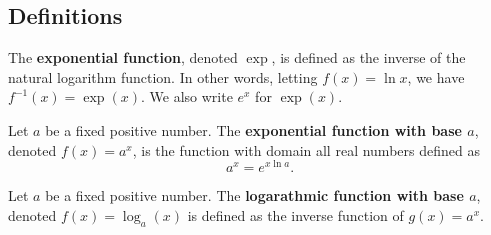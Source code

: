 \subsection*{Definitions}
\begin{namedtheorem} The {\bf exponential function}, denoted $\exp$, is defined as the inverse of the natural logarithm function. In other words, letting $f(x)=\ln x$, we have $f^{-1}(x)=\exp(x)$. We also write $e^x$ for $\exp(x)$.
\end{namedtheorem}
\begin{namedtheorem} Let $a$ be a fixed positive number. The {\bf exponential function with base $a$}, denoted $f(x)=a^x$, is the function with domain all real numbers defined as
  \[
  a^x=e^{x\ln a}.
  \]

\end{namedtheorem}
\begin{namedtheorem} Let $a$ be a fixed positive number. The {\bf logarathmic function with base $a$}, denoted $f(x)=\log_a(x)$ is defined as the inverse function of $g(x)=a^x$.

\end{namedtheorem}

